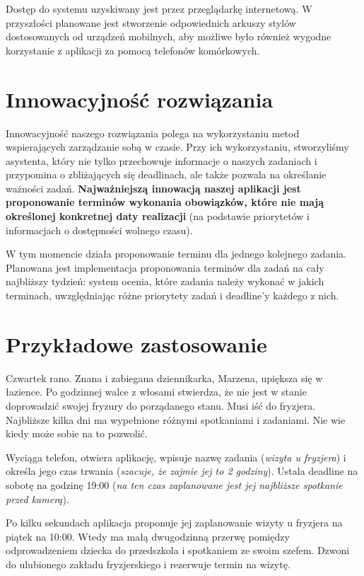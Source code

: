 \documentclass[pdflatex,11pt]{aghdpl}
\begin{document}
Dostęp do systemu uzyskiwany jest przez przeglądarkę internetową. W przyszłości planowane jest stworzenie odpowiednich arkuszy stylów dostosowanych od urządzeń mobilnych, aby możliwe było również wygodne korzystanie z aplikacji za pomocą telefonów komórkowych.

\section{Innowacyjność rozwiązania}

Innowacyjność naszego rozwiązania polega na wykorzystaniu metod wspierających zarządzanie sobą w czasie. Przy ich wykorzystaniu, stworzyliśmy asystenta, który nie tylko przechowuje informacje o naszych zadaniach i przypomina o zbliżających się deadlinach, ale także pozwala na określanie ważności zadań. \textbf{Najważniejszą innowacją naszej aplikacji jest proponowanie terminów wykonania obowiązków, które nie mają określonej konkretnej daty realizacji} (na podstawie priorytetów i informacjach o dostępności wolnego czasu).

W tym momencie działa proponowanie terminu dla jednego kolejnego zadania. Planowana jest implementacja proponowania terminów dla zadań na cały najbliższy tydzień: system ocenia, które zadania należy wykonać w jakich terminach, uwzględniając różne priorytety zadań i deadline'y każdego z nich.

\section{Przykładowe zastosowanie}

Czwartek rano. Znana i zabiegana dziennikarka, Marzena, upiększa się w łazience. Po godzinnej walce z włosami stwierdza, że nie jest w stanie doprowadzić swojej fryzury do porządanego stanu. Musi iść do fryzjera. Najbliższe kilka dni ma wypełnione różnymi spotkaniami i zadaniami. Nie wie kiedy może sobie na to pozwolić.

Wyciąga telefon, otwiera aplikację, wpisuje nazwę zadania (\textit{wizyta u fryzjera}) i określa jego czas trwania (\textit{szacuje, że zajmie jej to 2 godziny}). Ustala deadline na sobotę na godzinę 19:00 (\textit{na ten czas zaplanowane jest jej najbliższe spotkanie przed kamerą}).

Po kilku sekundach aplikacja proponuje jej zaplanowanie wizyty u fryzjera na piątek na 10:00. Wtedy ma małą dwugodzinną przerwę pomiędzy odprowadzeniem dziecka do przedszkola i spotkaniem ze swoim szefem. Dzwoni do ulubionego zakładu fryzjerskiego i rezerwuje termin na wizytę.
\end{document}
